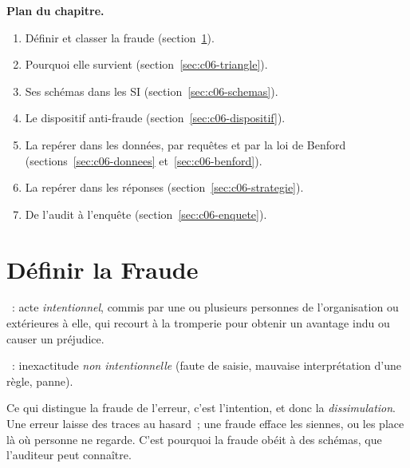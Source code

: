 \medskip
\textbf{Plan du chapitre.}
\begin{enumerate}
    \item Définir et classer la fraude (section~\ref{sec:c06-definir}).
    \item Pourquoi elle survient (section~\ref{sec:c06-triangle}).
    \item Ses schémas dans les SI (section~\ref{sec:c06-schemas}).
    \item Le dispositif anti-fraude (section~\ref{sec:c06-dispositif}).
    \item La repérer dans les données, par requêtes et par la loi de
          Benford (sections~\ref{sec:c06-donnees} et~\ref{sec:c06-benford}).
    \item La repérer dans les réponses (section~\ref{sec:c06-strategie}).
    \item De l'audit à l'enquête (section~\ref{sec:c06-enquete}).
\end{enumerate}

\separateur

\section{Définir la Fraude}
\label{sec:c06-definir}

\begin{boxdef}
~: acte \emph{intentionnel}, commis par une ou
plusieurs personnes de l'organisation ou extérieures à elle, qui recourt à
la tromperie pour obtenir un avantage indu ou causer un préjudice.

\medskip
{}~: inexactitude \emph{non intentionnelle}
(faute de saisie, mauvaise interprétation d'une règle, panne).
\end{boxdef}

Ce qui distingue la fraude de l'erreur, c'est l'intention, et donc la
\emph{dissimulation}. Une erreur laisse des traces au hasard~; une fraude
efface les siennes, ou les place là où personne ne regarde. C'est pourquoi
la fraude obéit à des schémas, que l'auditeur peut connaître.


